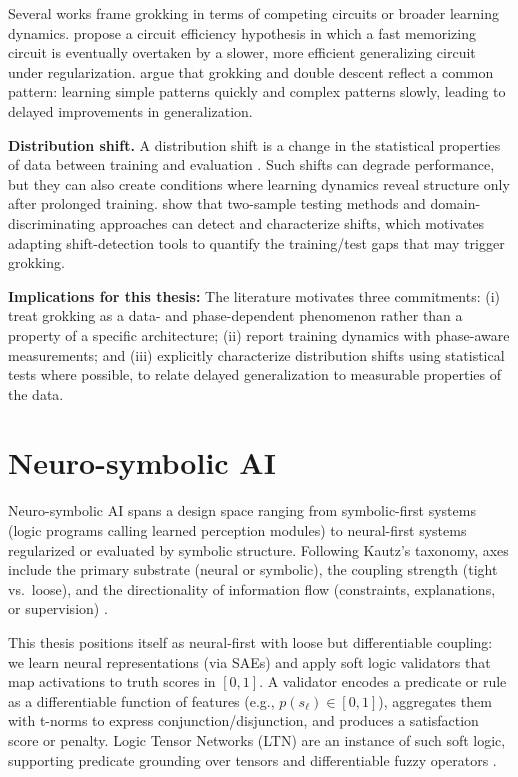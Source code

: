 \documentclass[../ppgc-tese.tex]{subfiles}
\begin{document}
Several works frame grokking in terms of competing circuits or broader learning dynamics.  propose a circuit efficiency hypothesis in which a fast memorizing circuit is eventually overtaken by a slower, more efficient generalizing circuit under regularization.  argue that grokking and double descent reflect a common pattern: learning simple patterns quickly and complex patterns slowly, leading to delayed improvements in generalization.

\textbf{Distribution shift.} A distribution shift is a change in the statistical properties of data between training and evaluation \cite{quinonero2022datashift}. Such shifts can degrade performance, but they can also create conditions where learning dynamics reveal structure only after prolonged training.  show that two-sample testing methods and domain-discriminating approaches can detect and characterize shifts, which motivates adapting shift-detection tools to quantify the training/test gaps that may trigger grokking.

\textbf{Implications for this thesis:} The literature motivates three commitments: (i) treat grokking as a data- and phase-dependent phenomenon rather than a property of a specific architecture; (ii) report training dynamics with phase-aware measurements; and (iii) explicitly characterize distribution shifts using statistical tests where possible, to relate delayed generalization to measurable properties of the data.

\section{Neuro-symbolic AI}
Neuro-symbolic AI spans a design space ranging from symbolic-first systems (logic programs calling learned perception modules) to neural-first systems regularized or evaluated by symbolic structure. Following Kautz's taxonomy, axes include the primary substrate (neural or symbolic), the coupling strength (tight vs.~loose), and the directionality of information flow (constraints, explanations, or supervision) \cite{kautz2022thirdaisummer,Garcez2009}.

This thesis positions itself as neural-first with loose but differentiable coupling: we learn neural representations (via SAEs) and apply soft logic validators that map activations to truth scores in $[0,1]$. A validator encodes a predicate or rule as a differentiable function of features (e.g., $p(s_\ell)\in[0,1]$), aggregates them with t-norms to express conjunction/disjunction, and produces a satisfaction score or penalty. Logic Tensor Networks (LTN) are an instance of such soft logic, supporting predicate grounding over tensors and differentiable fuzzy operators \cite{serafini2016ltn}.
\end{document}
